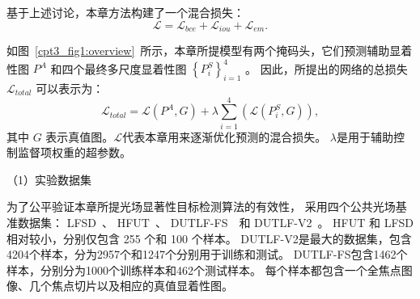 %
%
%
%
%
%
基于上述讨论，本章方法构建了一个混合损失：
%
%
%
\begin{equation} 
	\mathcal L = \mathcal L_{bce} + \mathcal L_{iou}  + \mathcal L_{em}  .
\end{equation}
%
%
%
%
\par
%
%
如图~\ref{cpt3_fig1:overview}~所示，本章所提模型有两个掩码头，它们预测辅助显着性图 $ P^{A} $ 和四个最终多尺度显着性图 $ \left \{ P_{i}^{S} \right \}_{i=1}^{4} $ 。 因此，所提出的网络的总损失 $ \mathcal L_{total} $ 可以表示为： 
%
\begin{equation}
	\mathcal L_{total} = \mathcal L\left ( P^{A}, G \right ) + \lambda  \sum_{i=1}^{4} \left ( \mathcal L \left (  P_{i}^{S},G \right )\right ),
\end{equation}
%
%
%
其中 $ G $ 表示真值图。$ \mathcal L $代表本章用来逐渐优化预测的混合损失。 $ \lambda $是用于辅助控制监督项权重的超参数。
























（1）实验数据集


为了公平验证本章所提光场显著性目标检测算法的有效性，
采用四个公共光场基准数据集：
LFSD~\cite{li2014saliency}、
HFUT~\cite{zhang2017saliency}、
DUTLF-FS~\cite{zhang2019memory}~和 
DUTLF-V2~\cite{piao2020dut}。 
HFUT 和 LFSD 相对较小，分别仅包含 255 个和 100 个样本。 
DUTLF-V2是最大的数据集，包含4204个样本，分为2957个和1247个分别用于训练和测试。 
DUTLF-FS包含1462个样本，分别分为1000个训练样本和462个测试样本。 
每个样本都包含一个全焦点图像、几个焦点切片以及相应的真值显着性图。





